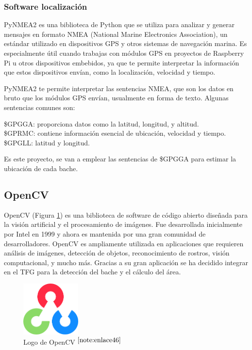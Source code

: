 \subsubsection{Software localización}

PyNMEA2 es una biblioteca de Python que se utiliza para analizar y generar mensajes en formato NMEA (National Marine Electronics Association), un estándar utilizado en dispositivos GPS y otros sistemas de navegación marina. Es especialmente útil cuando trabajas con módulos GPS en proyectos de Raspberry Pi u otros dispositivos embebidos, ya que te permite interpretar la información que estos dispositivos envían, como la localización, velocidad y tiempo.

PyNMEA2 te permite interpretar las sentencias NMEA, que son los datos en bruto que los módulos GPS envían, usualmente en forma de texto. Algunas sentencias comunes son:

\$GPGGA: proporciona datos como la latitud, longitud, y altitud.\\
\$GPRMC: contiene información esencial de ubicación, velocidad y tiempo.\\
\$GPGLL: latitud y longitud.

Es este proyecto, se van a emplear las sentencias de \$GPGGA para estimar la ubicación de cada bache.

\subsection{OpenCV}

OpenCV (Figura \ref{fig:opencv}) es una biblioteca de software de código abierto diseñada para la visión artificial y el procesamiento de imágenes. Fue desarrollada inicialmente por Intel en 1999 y ahora es mantenida por una gran comunidad de desarrolladores. OpenCV es ampliamente utilizada en aplicaciones que requieren análisis de imágenes, detección de objetos, reconocimiento de rostros, visión computacional, y mucho más. Gracias a su gran aplicación se ha decidido integrar en el TFG para la detección del bache y el cálculo del área.

\begin{figure} [h!]
	\begin{center}
		\includegraphics[width=3cm]{figs/opencv.png}
	\end{center}
	\caption{Logo de OpenCV $^{\ref{note:enlace46}}$} 
	\label{fig:opencv}
\end{figure}\

